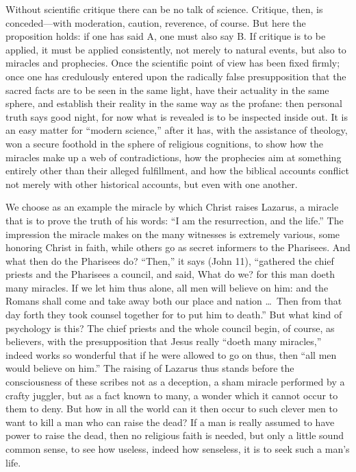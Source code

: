 \documentclass[12pt]{book}
\newcommand{\opage}[1]{\marginnote{\footnotesize\textit{[#1]}}}
\begin{document}
Without scientific critique there can be no talk of science. Critique,
then, is conceded---with moderation, caution, reverence, of course. But
here the proposition holds: if one has said A, one must also say B. If
critique is to be applied, it must be applied consistently, not merely
to natural events, but also to miracles and prophecies. Once the
scientific point of view has been fixed firmly; once one has credulously
entered upon the radically false presupposition that the sacred facts
are to be seen in the same light, have
their actuality in the same sphere, and establish their reality in the
same way as the profane: then personal truth says good night, for now
what is revealed is to be inspected inside out. It is an easy matter for
``modern science,'' after it has, with the assistance of theology, won a
secure foothold in the sphere of religious cognitions, to show how the
miracles make up a web of contradictions, how the prophecies aim at
something entirely other than their alleged fulfillment,
\opage{84}\setcounter{footnote}{0}%
and how the biblical accounts conflict not merely with other historical
accounts, but even with one another.

We choose as an example the miracle by which Christ raises Lazarus, a
miracle that is to prove the truth of his words: ``I am the resurrection,
and the life.'' The impression the miracle makes on the many witnesses is
extremely various, some honoring Christ in faith, while others go as
secret informers to the Pharisees. And what then do the Pharisees do?
``Then,'' it says (John 11),
``gathered the chief priests and the Pharisees a council, and said, What
do we? for this man doeth many miracles. If we let him thus alone, all
men will believe on him: and the Romans shall come and take away both
our place and nation \dots\ Then from that day forth they took counsel
together for to put him to death.'' But what kind of psychology is this?
The chief priests and the whole council begin, of course, as believers,
with the presupposition that Jesus really ``doeth many miracles,'' indeed
works so wonderful that if he were allowed to go on thus, then ``all men
would believe on him.'' The raising of Lazarus thus stands before the
consciousness of these scribes not as a deception, a sham miracle
performed by a crafty juggler, but as a fact known to many, a wonder
which it cannot occur to them to deny. But how in all the world can it
then occur to such clever men to want to kill a man who can raise the
dead? If a man is really assumed to have power to raise the dead, then
no religious faith is needed, but only a little sound common sense, to
see how useless, indeed how senseless, it is to seek such a man's life.
\end{document}
